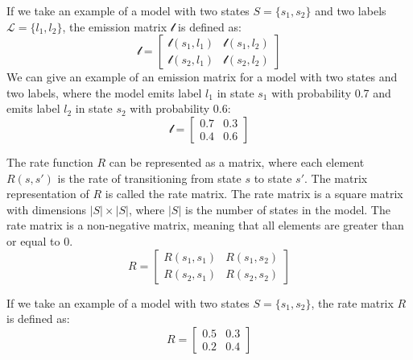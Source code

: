 If we take an example of a model with two states $S = \{s_1, s_2\}$ and two labels $\mathcal{L} = \{l_1, l_2\}$, the emission matrix $\mathcal{l}$ is defined as:
\begin{equation}
    \mathcal{l} = \begin{bmatrix}
        \mathcal{l}(s_1, l_1) & \mathcal{l}(s_1, l_2) \\
        \mathcal{l}(s_2, l_1) & \mathcal{l}(s_2, l_2)
    \end{bmatrix}
\end{equation}
We can give an example of an emission matrix for a model with two states and two labels, where the model emits label $l_1$ in state $s_1$ with probability 0.7 and emits label $l_2$ in state $s_2$ with probability 0.6:
\begin{equation}
    \mathcal{l} = \begin{bmatrix}
        0.7 & 0.3 \\
        0.4 & 0.6
    \end{bmatrix}
\end{equation}

The rate function $R$ can be represented as a matrix, where each element $R(s, s')$ is the rate of transitioning from state $s$ to state $s'$. The matrix representation of $R$ is called the rate matrix. The rate matrix is a square matrix with dimensions $|S| \times |S|$, where $|S|$ is the number of states in the model. The rate matrix is a non-negative matrix, meaning that all elements are greater than or equal to 0.
\begin{equation}
    R = \begin{bmatrix}
        R(s_1, s_1) & R(s_1, s_2) \\
        R(s_2, s_1) & R(s_2, s_2)
    \end{bmatrix}
\end{equation}

If we take an example of a model with two states $S = \{s_1, s_2\}$, the rate matrix $R$ is defined as:
\begin{equation}
    R = \begin{bmatrix}
        0.5 & 0.3 \\
        0.2 & 0.4
    \end{bmatrix}   
\end{equation}